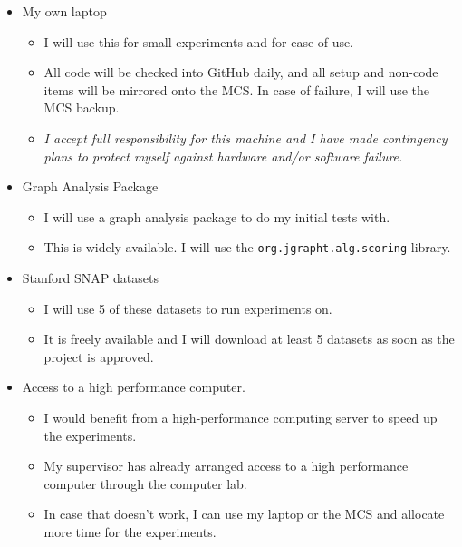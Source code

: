 \documentclass[a4paper,12pt]{article}
\begin{document}
\begin{itemize}

\item My own laptop
\begin{itemize}

\item I will use this for small experiments and for ease of use. 
\item All code will be checked into GitHub daily, and all setup and non-code items will be mirrored onto the MCS. In case of failure, I will use the MCS backup.
\item \textit{I accept full responsibility for this machine and I have made contingency plans to protect myself against hardware and/or software failure.}
\end{itemize}

\item Graph Analysis Package
\begin{itemize}
\item I will use a graph analysis package to do my initial tests with. 
\item This is widely available. I will use the \texttt{org.jgrapht.alg.scoring} library.
\end{itemize}

\item Stanford SNAP datasets
\begin{itemize}
\item I will use 5 of these datasets to run experiments on. 
\item It is freely available and I will download at least 5 datasets as soon as the project is approved.
\end{itemize}
\newpage
\item Access to a high performance computer.
\begin{itemize}
\item I would benefit from a high-performance computing server to speed up the experiments. 
\item My supervisor has already arranged access to a high performance computer through the computer lab. 
\item In case that doesn't work, I can use my laptop or the MCS and allocate more time for the experiments.
\end{itemize}
\end{itemize}


\newpage


\end{document}

